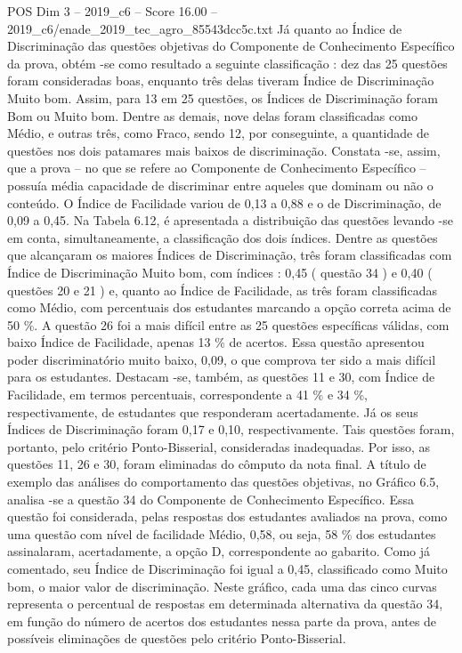 \begin{textsample}{POS Dim 3 – 2019\_c6 – Score 16.00 – 2019\_c6/enade\_2019\_tec\_agro\_85543dcc5c.txt}
Já quanto ao Índice de Discriminação das questões objetivas do Componente de Conhecimento Específico da prova, obtém -se como resultado a seguinte classificação : dez das 25 questões foram consideradas boas, enquanto três delas tiveram Índice de Discriminação Muito bom.
Assim, para 13 em 25 questões, os Índices de Discriminação foram Bom ou Muito bom.
Dentre as demais, nove delas foram classificadas como Médio, e outras três, como Fraco, sendo 12, por conseguinte, a quantidade de questões nos dois patamares mais baixos de discriminação.
Constata -se, assim, que a prova – no que se refere ao Componente de Conhecimento Específico – possuía média capacidade de discriminar entre aqueles que dominam ou não o conteúdo.
O Índice de Facilidade variou de 0,13 a 0,88 e o de Discriminação, de 0,09 a 0,45.
Na Tabela 6.12, é apresentada a distribuição das questões levando -se em conta, simultaneamente, a classificação dos dois índices.
Dentre as questões que alcançaram os maiores Índices de Discriminação, três foram classificadas com Índice de Discriminação Muito bom, com índices : 0,45 ( questão 34 ) e 0,40 ( questões 20 e 21 ) e, quanto ao Índice de Facilidade, as três foram classificadas como Médio, com percentuais dos estudantes marcando a opção correta acima de 50 \%.
A questão 26 foi a mais difícil entre as 25 questões específicas válidas, com baixo Índice de Facilidade, apenas 13 \% de acertos.
Essa questão apresentou poder discriminatório muito baixo, 0,09, o que comprova ter sido a mais difícil para os estudantes.
Destacam -se, também, as questões 11 e 30, com Índice de Facilidade, em termos percentuais, correspondente a 41 \% e 34 \%, respectivamente, de estudantes que responderam acertadamente.
Já os seus Índices de Discriminação foram 0,17 e 0,10, respectivamente.
Tais questões foram, portanto, pelo critério Ponto-Bisserial, consideradas inadequadas.
Por isso, as questões 11, 26 e 30, foram eliminadas do cômputo da nota final.
A título de exemplo das análises do comportamento das questões objetivas, no Gráfico 6.5, analisa -se a questão 34 do Componente de Conhecimento Específico.
Essa questão foi considerada, pelas respostas dos estudantes avaliados na prova, como uma questão com nível de facilidade Médio, 0,58, ou seja, 58 \% dos estudantes assinalaram, acertadamente, a opção D, correspondente ao gabarito.
Como já comentado, seu Índice de Discriminação foi igual a 0,45, classificado como Muito bom, o maior valor de discriminação.
Neste gráfico, cada uma das cinco curvas representa o percentual de respostas em determinada alternativa da questão 34, em função do número de acertos dos estudantes nessa parte da prova, antes de possíveis eliminações de questões pelo critério Ponto-Bisserial.

\end{textsample}
